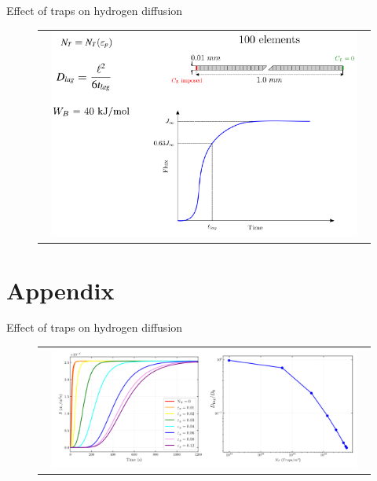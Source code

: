 \documentclass[9pt]{beamer}
\begin{document}
\begin{frame}[noframenumbering]{Effect of traps on hydrogen diffusion}

	\begin{figure}
        \begin{tabular}{c}
            \includegraphics[width=0.95\textwidth]{Images/effect_traps.pdf}
        \end{tabular}
    \end{figure}

\end{frame}


\section*{Appendix}

\begin{frame}[noframenumbering]{Effect of traps on hydrogen diffusion}

	\begin{figure}
        \begin{tabular}{c}
            \includegraphics[width=0.95\textwidth]{Images/effect_traps_2.pdf}
        \end{tabular}
    \end{figure}

\end{frame}
\end{document}
